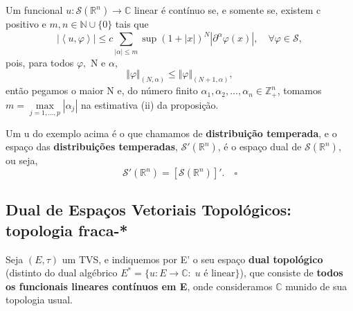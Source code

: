 \documentclass[../distribution_theory_notes.tex]{subfiles}
\begin{document}
 \begin{example}
   Um funcional \(u:\mathcal{S}(\mathbb{R}^{n})\rightarrow \mathbb{C}\) linear é contínuo se, e somente se, existem c positivo e \(m, n\in \mathbb{N}\cup \{0\}\) tais que 
     \[
       |\left< u, \varphi  \right>|\leq c \sum\limits_{|\alpha |\leq m}^{} \sup_{}(1+|x|)^{N}|\partial^{\alpha }\varphi (x)|, \quad \forall \varphi \in \mathcal{S},
     \] 
     pois, para todos \(\varphi,\) N e \(\alpha \), 
       \[
         \Vert \varphi  \Vert_{(N, \alpha )}\leq \Vert \varphi  \Vert_{(N+1, \alpha )},
       \]
       então pegamos o maior N e, do número finito \(\alpha_1, \alpha_2,\dotsc ,\alpha_{n}\in \mathbb{Z}_{+}^{n}\), tomamos \(m = \max\limits_{j=1,\dotsc , p }|\alpha_{j}|\) na estimativa (ii) da proposição. 
\end{example}
\begin{def*}
   Um u do exemplo acima é o que chamamos de \textbf{distribuição temperada}, e o espaço das \textbf{distribuições temperadas}, \(\mathcal{S}'(\mathbb{R}^{n} )\), é o espaço dual de \(\mathcal{S}(\mathbb{R}^{n} )\), ou seja, 
     \[
      \mathcal{S}'(\mathbb{R}^{n} )=[\mathcal{S}(\mathbb{R}^{n} )]'. \quad \square
     \]
 \end{def*}

\subsection{Dual de Espaços Vetoriais Topológicos: topologia fraca-*}
Seja \((E, \tau )\) um TVS, e indiquemos por E' o seu espaço \textbf{dual topológico} (distinto do dual algébrico \(E^{*}=\{u:E\rightarrow \mathbb{C}:\; u\text{ é linear}\}\)), que consiste de \textbf{todos os funcionais lineares contínuos em E}, onde consideramos \(\mathbb{C}\) munido de sua topologia usual. 
\end{document}
